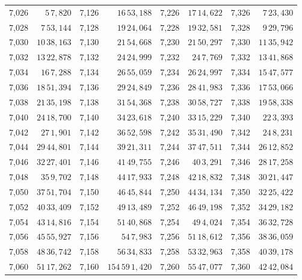 \begin{tabular}{|r|r||r|r||r|r||r|r|}
7,026 & \(5\,7,\!820\) & 7,126 & \(16\,53,\!188\) & 7,226 & \(17\,14,\!622\) & 7,326 & \(7\,23,\!430\) \\
7,028 & \(7\,53,\!144\) & 7,128 & \(19\,24,\!064\) & 7,228 & \(19\,32,\!581\) & 7,328 & \(9\,29,\!796\) \\
7,030 & \(10\,38,\!163\) & 7,130 & \(21\,54,\!668\) & 7,230 & \(21\,50,\!297\) & 7,330 & \(11\,35,\!942\) \\[1pt]
7,032 & \(13\,22,\!878\) & 7,132 & \(24\,24,\!999\) & 7,232 & \(24\,7,\!769\) & 7,332 & \(13\,41,\!868\) \\
7,034 & \(16\,7,\!288\) & 7,134 & \(26\,55,\!059\) & 7,234 & \(26\,24,\!997\) & 7,334 & \(15\,47,\!577\) \\
7,036 & \(18\,51,\!394\) & 7,136 & \(29\,24,\!849\) & 7,236 & \(28\,41,\!983\) & 7,336 & \(17\,53,\!066\) \\
7,038 & \(21\,35,\!198\) & 7,138 & \(31\,54,\!368\) & 7,238 & \(30\,58,\!727\) & 7,338 & \(19\,58,\!338\) \\
7,040 & \(24\,18,\!700\) & 7,140 & \(34\,23,\!618\) & 7,240 & \(33\,15,\!229\) & 7,340 & \(22\,3,\!393\) \\[1pt]
7,042 & \(27\,1,\!901\) & 7,142 & \(36\,52,\!598\) & 7,242 & \(35\,31,\!490\) & 7,342 & \(24\,8,\!231\) \\
7,044 & \(29\,44,\!801\) & 7,144 & \(39\,21,\!311\) & 7,244 & \(37\,47,\!511\) & 7,344 & \(26\,12,\!852\) \\
7,046 & \(32\,27,\!401\) & 7,146 & \(41\,49,\!755\) & 7,246 & \(40\,3,\!291\) & 7,346 & \(28\,17,\!258\) \\
7,048 & \(35\,9,\!702\) & 7,148 & \(44\,17,\!933\) & 7,248 & \(42\,18,\!832\) & 7,348 & \(30\,21,\!447\) \\
7,050 & \(37\,51,\!704\) & 7,150 & \(46\,45,\!844\) & 7,250 & \(44\,34,\!134\) & 7,350 & \(32\,25,\!422\) \\[1pt]
7,052 & \(40\,33,\!409\) & 7,152 & \(49\,13,\!489\) & 7,252 & \(46\,49,\!198\) & 7,352 & \(34\,29,\!182\) \\
7,054 & \(43\,14,\!816\) & 7,154 & \(51\,40,\!868\) & 7,254 & \(49\,4,\!024\) & 7,354 & \(36\,32,\!728\) \\
7,056 & \(45\,55,\!927\) & 7,156 & \(54\,7,\!983\) & 7,256 & \(51\,18,\!612\) & 7,356 & \(38\,36,\!059\) \\
7,058 & \(48\,36,\!742\) & 7,158 & \(56\,34,\!833\) & 7,258 & \(53\,32,\!963\) & 7,358 & \(40\,39,\!178\) \\
7,060 & \(51\,17,\!262\) & 7,160 & \(154\,59\,1,\!420\) & 7,260 & \(55\,47,\!077\) & 7,360 & \(42\,42,\!084\) \\[1pt]

\end{tabular}
